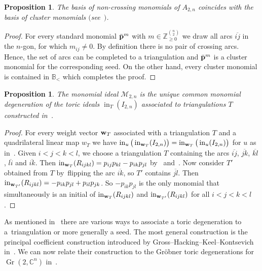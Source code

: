 \documentclass[pdftex]{sigma}%
\newtheorem{Proposition}[Theorem]{Proposition}
\numberwithin{equation}{section}
\DeclareMathOperator{\init}{in}
\DeclareMathOperator{\Gr}{Gr}
\begin{document}
\begin{Proposition}
The basis of non-crossing monomials of $A_{2,n}$ coincides with the basis of cluster monomials $($see~$)$.
\end{Proposition}

\begin{proof}
For every standard monomial $\bar{\bf p}^m$ with $m\in \mathbb Z_{\ge 0}^{\binom{n}{2}}$ we draw all arcs $\overline{ij}$ in the $n$-gon, for which $m_{ij}\not =0$.
By definition there is no pair of crossing arcs.
Hence, the set of arcs can be completed to a triangulation and $\bar{\bf p}^m$ is a cluster monomial for the corresponding seed. On the other hand, every cluster monomial is contained in $\mathbb B_{<}$ which completes the proof.
\end{proof}

\begin{Proposition}
The monomial ideal $\mathcal M_{2,n}$ is the unique common monomial degeneration of the toric ideals $\init_{T}(I_{2,n})$ associated to triangulations $T$ constructed in~.
\end{Proposition}
\begin{proof}
For every weight vector ${\bf w}_T$ associated with a triangulation $T$ and a quadrilateral linear map $w_T$ we have $\init_u\big(\init_{{\bf w}_T}(I_{2,n})\big)=\init_{{\bf w}_T}\big(\init_u(I_{2,n})\big)$ for $u$ as in~.
Given $i<j<k<l$, we choose a triangulation $T$ containing the arcs $\overline{ij}$, $\overline{jk}$, $\overline{kl}$, $\overline{li}$ and $\overline{ik}$.
Then $\init_{{\bf w}_T}(R_{ijkl})=p_{ij}p_{kl}-p_{ik}p_{jl}$ by~ and~.
Now consider $T'$ obtained from $T$ by~flipping the arc $\overline{ik}$, so $T'$ contains $\overline{jl}$.
Then $\init_{{\bf w}_{T'}}(R_{ijkl})=-p_{ik}p_{jl}+p_{il}p_{jk}$.
So $-p_{ik}p_{jl}$ is the only monomial that simultaneously is an initial of $\init_{{\bf w}_{T}}(R_{ijkl})$ and $\init_{{\bf w}_{T'}}(R_{ijkl})$ for all $i<j<k<l$.
\end{proof}

As mentioned in~ there are various ways to associate a toric degeneration to a~triangulation or more generally a seed.
The most general construction is the principal coefficient construction introduced by Gross--Hacking--Keel--Kontsevich in~\cite[Section~8]{GHKK}.
We can now relate their construction to the Gr\"obner toric degenerations for $\Gr(2,\mathbb C^n)$ in~.
\end{document}
